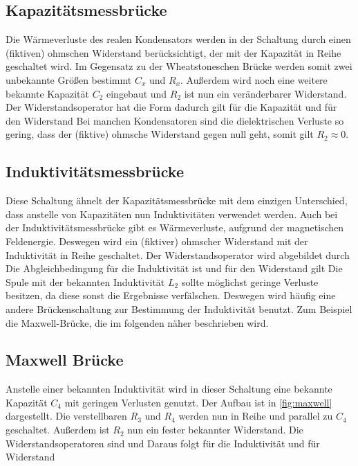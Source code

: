 \subsection{Kapazitätsmessbrücke}
\label{subsec:kapazitäts}
Die Wärmeverluste des realen Kondensators werden in der Schaltung durch einen (fiktiven) ohmschen Widerstand berücksichtigt, der mit der Kapazität in Reihe geschaltet wird.
Im Gegensatz zu der Wheatstoneschen Brücke werden somit zwei unbekannte Größen bestimmt $C_x$ und $R_x$.
Außerdem wird noch eine weitere bekannte Kapazität $C_2$ eingebaut und $R_2$ ist nun ein veränderbarer Widerstand.
Der Widerstandsoperator hat die Form
dadurch gilt für die Kapazität
und für den Widerstand
Bei manchen Kondensatoren sind die dielektrischen Verluste so gering, dass der (fiktive) ohmsche Widerstand gegen null geht, somit gilt $R_2 \approx 0$.


\subsection{Induktivitätsmessbrücke}
\label{subsec:induktivität}
Diese Schaltung ähnelt der Kapazitätsmessbrücke mit dem einzigen Unterschied, dass anstelle von Kapazitäten nun Induktivitäten verwendet werden.
Auch bei der Induktivitätsmessbrücke gibt es Wärmeverluste, aufgrund der magnetischen Feldenergie.
Deswegen wird ein (fiktiver) ohmscher Widerstand mit der Induktivität in Reihe geschaltet.
Der Widerstandsoperator wird abgebildet durch
Die Abgleichbedingung für die Induktivität ist
und für den Widerstand gilt
Die Spule mit der bekannten Induktivität $L_2$ sollte möglichst geringe Verluste besitzen, da diese sonst die Ergebnisse verfälschen. 
Deswegen wird häufig eine andere Brückenschaltung zur Bestimmung der Induktivität benutzt.
Zum Beispiel die Maxwell-Brücke, die im folgenden näher beschrieben wird.

\subsection{Maxwell Brücke}
\label{subsec:maxwell}
Anstelle einer bekannten Induktivität wird in dieser Schaltung eine bekannte Kapazität $C_4$ mit geringen Verlusten genutzt.
Der Aufbau ist in \autoref{fig:maxwell} dargestellt.
Die verstellbaren $R_3$ und $R_4$ werden nun in Reihe und parallel zu $C_4$ geschaltet.
Außerdem ist $R_2$ nun ein fester bekannter Widerstand.
Die Widerstandsoperatoren sind
und
Daraus folgt
für die Induktivität und für Widerstand

